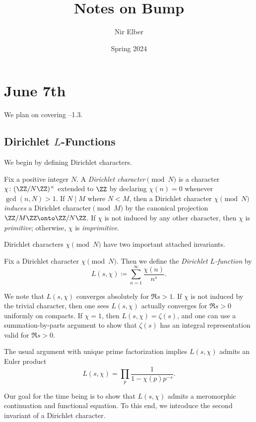 \documentclass{article}
\title{Notes on Bump}
\author{Nir Elber}
\date{Spring 2024}
\begin{document}
\maketitle

\tableofcontents

\section{June 7th}
We plan on covering --1.3.

\subsection{Dirichlet \texorpdfstring{$L$}{ L}-Functions}
We begin by defining Dirichlet characters.
\begin{definition}
	Fix a positive integer $N$. A \textit{Dirichlet character$\pmod N$} is a character $\chi\colon(\ZZ/N\ZZ)^\times$ extended to $\ZZ$ by declaring $\chi(n)=0$ whenever $\gcd(n,N)>1$. If $N\mid M$ where $N<M$, then a Dirichlet character $\chi\pmod N$ \textit{induces} a Dirichlet character$\pmod M$ by the canonical projection $\ZZ/M\ZZ\onto\ZZ/N\ZZ$. If $\chi$ is not induced by any other character, then $\chi$ is \textit{primitive}; otherwise, $\chi$ is \textit{imprimitive}.
\end{definition}
Dirichlet characters $\chi\pmod N$ have two important attached invariants.
\begin{definition}[$L$-function]
	Fix a Dirichlet character $\chi\pmod N$. Then we define the \textit{Dirichlet $L$-function} by
	\[L(s,\chi)\coloneqq\sum_{n=1}^\infty\frac{\chi(n)}{n^s}.\]
\end{definition}
\begin{remark}
	We note that $L(s,\chi)$ converges absolutely for $\Re s>1$. If $\chi$ is not induced by the trivial character, then one sees $L(s,\chi)$ actually converges for $\Re s>0$ uniformly on compacts. If $\chi=1$, then $L(s,\chi)=\zeta(s)$, and one can use a summation-by-parts argument to show that $\zeta(s)$ has an integral representation valid for $\Re s>0$.
\end{remark}
\begin{remark}
	The usual argument with unique prime factorization implies $L(s,\chi)$ admits an Euler product
	\[L(s,\chi)=\prod_p\frac1{1-\chi(p)p^{-s}}.\]
\end{remark}
Our goal for the time being is to show that $L(s,\chi)$ admits a meromorphic continuation and functional equation. To this end, we introduce the second invariant of a Dirichlet character.
\end{document}

